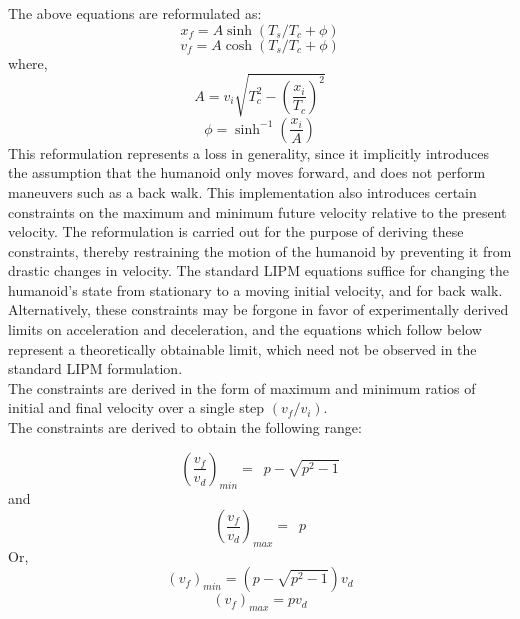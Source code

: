 \documentclass[letterpaper, 10 pt, conference]{ieeeconf}  %
\begin{document}
The above equations are reformulated as:
\begin{equation}
x_{f} = A\sinh\left(T_{s}/T_{c} + \phi\right)
\end{equation}
\begin{equation}
v_{f} = A\cosh\left(T_{s}/T_{c} + \phi\right)
\end{equation}
where,
\begin{equation}
 A=v_{i}\sqrt{T_{c}^{2}-\left(\frac{x_{i}}{T_{c}}\right)^{2}}
  \end{equation}
  \begin{equation}
  \phi=\sinh^{-1}\left(\frac{x_{i}}{A}\right)
\end{equation}
 This reformulation represents a loss in generality, since it implicitly
 introduces the assumption that the humanoid only moves forward, and does not
 perform maneuvers such as a back walk. This implementation also introduces
 certain constraints on the maximum and minimum future velocity relative to
 the present velocity. The reformulation is carried out for the purpose of deriving these constraints,
thereby restraining the motion of the humanoid by preventing it from drastic changes in velocity. The standard LIPM equations suffice for changing the humanoid's state from stationary to a moving
initial velocity, and for back walk. Alternatively, these constraints may be forgone in favor of experimentally derived limits on acceleration and deceleration, and the equations which follow below 
represent a theoretically obtainable limit, which need not be observed in the standard LIPM formulation.
\\
The constraints are derived in
 the form of maximum and minimum ratios of initial and final velocity over a single step $\left(v_{f}/v_{i}\right)$.\\
 The constraints are derived to obtain the following range:

 \begin{equation}
 \left(\frac{v_f}{v_d}\right)_{min} =\enspace p - \sqrt{p^2 - 1}
 \end{equation}
 and
 \begin{equation}
 \left(\frac{v_f}{v_d}\right)_{max}=\enspace p
 \end{equation}
 Or,
 \begin{equation}
(v_f)_{min}	    = \left(p - \sqrt{p^2 - 1}\right)v_d
 \end{equation}
 \begin{equation}
 (v_f)_{max}=pv_d
  \end{equation}
\end{document}
